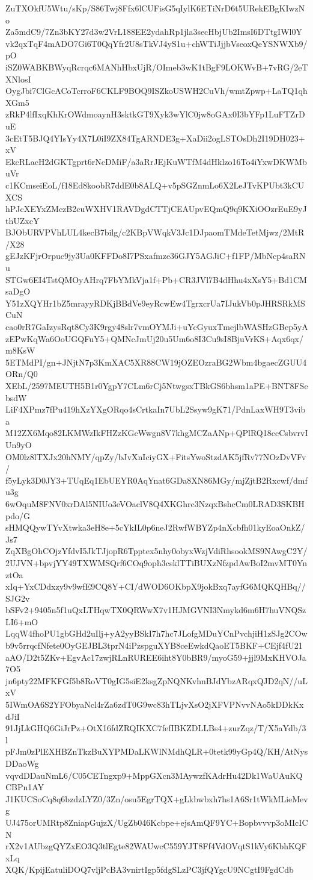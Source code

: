 ZuTXOkfU5Wtu/sKp/S86Twj8Ffx6lCUFisG5qIylK6ETiNrD6t5URekEBgKIwzNo
Za5mdC9/7Zn3bKY27d3w2VrL188EE2ydahRp1jla3secHbjUb2ImsI6DTtgIWl0Y
vk2qxTqF4mADO7Gi6T0QqYfr2U8sTkVJ4yS1u+chWTiJjjbVseoxQeYSNWXb9/pO
iSZ0WABKBWyqRcrqc6MANhHbxUjR/OImeb3wK1tBgF9LOKWvB+7vRG/2eTXNlosI
OygJbi7ClGcACoTcrroF6CKLF9BOQ9ISZkoUSWH2CuVh/wmtZpwp+LaTQ1qhXGm5
zRkP4lfIxqKhKrOWdmoaynH3sktkGT9Xyk3wYlC0jw8oGAx0I3bYFp1LuFTZrDuE
3cEtT5BJQ4YIsYy4X7L0iI9ZX84TgARNDE3g+XaDii2ogLSTOsDh2I19DH023+xV
EkcRLacH2dGKTgprt6rNcDMiF/a3aRrJEjKuWTfM4dHklzo16To4iYxwDKWMbuVr
c1KCmseiEoL/f18Ed8koobR7ddE0b8ALQ+v5pSGZnmLo6X2LeJTvKPUbt3kCUXCS
hPJcXEYxZMczB2cuWXHV1RAVDgdCTTjCEAUpvEQmQ9q9KXiOOzrEuE9yJthUZxcY
BJObURVPVhLUL4kecB7bilg/c2KBpVWqkV3Jc1DJpaomTMdeTetMjwz/2MtR/X28
gEJzKFjrOrpuc9jy3Ua0KFFDo8I7PSxafmze36GJY5AGJiC+f1FP/MbNcp4saRNu
STGw6EI4TstQMOyAHrq7FbYMkVja1f+Pb+CR3JVl7B4dHhu4xXsY5+Bd1CMsaDgO
Y51zXQYHr1bZ5mrayyRDKjBBdVe9eyRcwEw4TgrxcrUa7IJukVb0pJHRSRkMSCuN
cao0rR7GaIzysRqt8Cy3K9rgy48slr7vmOYMJi+uYcGyuxTmejlbWASHzGBep5yA
zEPwKqWa6OoUGQFuY5+QMNcJmUj20u5Um6o8I3Cu9sI8BjuVrKS+Aqx6qx/m8KsW
5ETMdPI/gn+JNjtN7p3KmXAC5XR88CW19jOZEOzraBG2Wbm4bgaecZGUU4ORn/Q0
XEbL/2597MEUTH5B1r0YgpY7CLm6rCj5NtwgsxTBkGS6bhsm1aPE+BNT8FSebsdW
LiF4XPmz7fPu419hXzYXgORqo4sCrtkaIn7UbL2Ssyw9gK71/PdnLaxWH9T3viba
M12ZX6Mqo82LKMWzIkFHZzKGcWwgn8V7khgMCZaANp+QPlRQ18ccCsbvrvIUn9yO
OM0lz8lTXJx20hNMY/qpZy/bJvXnIciyGX+FitsYwoStzdAK5jfRv77NOzDvVFv/
f5yLyk3D0JY3+TUqEq1EbUEYR0AqYnat6GDa8XN86MGy/mjZjtB2Rxcwf/dmfu3g
6wOquM8FNV0xrDAl5NIUo3eVOaclV8Q4XKGhrc3NzqxBshcCm0LRAD3SKBHpdo/G
sHMQQywTYvXtwka3eH8e+5cYkIL0p6neJ2RwfWBYZp4nXcbfh01kyEoaOnkZ/Js7
ZqXBgOhCOjzYfdvI5JkTJjopR6Tpptex5nhy0obyxWzjVdiRhsookMS9NAwgC2Y/
2UJVN+bpvjYY49TXWMSQrf6COq9oph3csklTTiBUXzNfzpdAwBoI2mvMT0YnztOa
xIq+YxCDdxzy9v9wfE9CQ8Y+CI/dWOD6OKbpX9jokBxq7ayfG6MQKQHBq//SJG2v
bSFv2+9405n5f1uQxLTHqwTX0QRWwX7v1HJMGVNI3Nmykd6m6H7huVNQSzLI6+mO
LqqW4fhoPU1gbGHd2uIlj+yA2yyBSkI7h7hc7JLofgMDuYCnPvchjiH1zSJg2COw
b9v5rrqcfNfete0OyGEJBL3tprN4iPzspguXYB8ceEwkdQaoET5BKF+CEjf4fU21
aAO/D2t5ZKv+EgvAc17zwjRLnRUREE6iht8Y0bBR9/myoG59+jjl9MxKHVOJa7O5
jn6pty22MFKFGf5b8RoVT0gIG5siE2ksgZpNQNKvhnBJdYbzARqxQJD2qN//uLxV
5IWmOA6S2YFObyaNcl4rZa6zdT0G9wc83hTLjvXsO2jXFVPNvvNAo5kDDkKxdJiI
91JjLkGHQ6GiJrPz+OtX16fdZRQIKXC7fefIBKZDLLBs4+zurZqz/T/X5aYdb/3l
pFJm0zPlEXHBZnTkzBuXYPMDaLKWlNMdhQLR+0tetk99yGp4Q/KH/AtNysDDaoWg
vqvdDDauNmL6/C05CETngxp9+MppGXcn3MAywzfKAdrHu42Dk1WaUAuKQCBPn1AY
J1KUCSoCq8q6bzdzLYZ0/3Zn/osu5EgrTQX+gLkbwbxh7hs1A6Sr1tWkMLieMevg
UJ475orUMRtp8ZniapGujzX/UgZb046Kcbpe+ejsAmQF9YC+Bopbvvvp3oMIcICN
rX2v1AUbzgQYZxEO3Q3tlEgte82WAUwcC559YJT8Ff4VdOVqtS1kVy6KbhKQFxLq
XQK/KpijEatuliDOQ7vljPcBA3vnirtIgp5fdgSLzPC3jfQYgcU9NCgtI9FgdCdb
